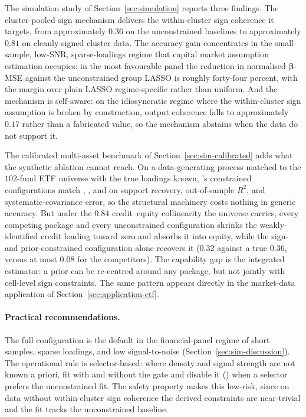 \documentclass[article]{jss}
\begin{document}
The simulation study of Section~\ref{sec:simulation} reports three
findings. The cluster-pooled sign mechanism delivers the within-cluster
sign coherence it targets, from approximately $0.36$ on the
unconstrained baselines to approximately $0.81$ on cleanly-signed
cluster data. The accuracy gain concentrates in the small-sample,
low-SNR, sparse-loadings regime that capital market assumption
estimation occupies: in the most favourable panel the reduction in
normalised $\bm{\beta}$-MSE against the unconstrained group LASSO is
roughly forty-four percent, with the margin
over plain LASSO regime-specific rather than uniform. And the mechanism
is self-aware: on the idiosyncratic regime where the within-cluster sign
assumption is broken by construction, output coherence falls to
approximately $0.17$ rather than a fabricated value, so the mechanism
abstains when the data do not support it.

The calibrated multi-asset benchmark of Section~\ref{sec:sim-calibrated}
adds what the synthetic ablation cannot reach. On a data-generating
process matched to the $102$-fund ETF universe with the true loadings
known, 's constrained configurations match
, , and  on support recovery,
out-of-sample $R^2$, and systematic-covariance error, so the structural
machinery costs nothing in generic accuracy. But under the $0.84$
credit--equity collinearity the universe carries, every competing
package and every unconstrained configuration shrinks the
weakly-identified credit loading toward zero and absorbs it into equity,
while the sign- and prior-constrained configuration alone recovers it
($0.32$ against a true $0.36$, versus at most $0.08$ for the
competitors). The capability gap is the integrated estimator: a prior
can be re-centred around any package, but not jointly with cell-level
sign constraints. The same pattern appears directly in the market-data
application of Section~\ref{sec:application-etf}.

\paragraph{Practical recommendations.}
The full  configuration is the default in the
financial-panel regime of short samples, sparse loadings, and low
signal-to-noise (Section~\ref{sec:sim-discussion}). The operational rule
is selector-based: where density and signal strength are not known a
priori, fit with and without the gate and disable it
() when a selector prefers the
unconstrained fit. The safety property makes this low-risk, since on
data without within-cluster sign coherence the derived constraints are
near-trivial and the fit tracks the unconstrained baseline.
\end{document}
